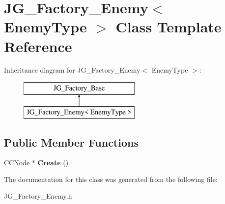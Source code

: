 \hypertarget{class_j_g___factory___enemy}{\section{J\-G\-\_\-\-Factory\-\_\-\-Enemy$<$ Enemy\-Type $>$ Class Template Reference}
\label{class_j_g___factory___enemy}
}
Inheritance diagram for J\-G\-\_\-\-Factory\-\_\-\-Enemy$<$ Enemy\-Type $>$\-:\begin{figure}[H]
\begin{center}
\leavevmode
\includegraphics[height=2.000000cm]{class_j_g___factory___enemy}
\end{center}
\end{figure}
\subsection*{Public Member Functions}
\begin{DoxyCompactItemize}
\item 
\hypertarget{class_j_g___factory___enemy_afb37f360b552170832d8c55d42017c41}{C\-C\-Node $\ast$ {\bfseries Create} ()}\label{class_j_g___factory___enemy_afb37f360b552170832d8c55d42017c41}

\end{DoxyCompactItemize}


The documentation for this class was generated from the following file\-:\begin{DoxyCompactItemize}
\item 
J\-G\-\_\-\-Factory\-\_\-\-Enemy.\-h\end{DoxyCompactItemize}
